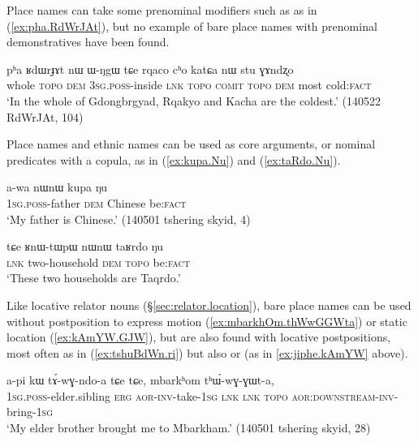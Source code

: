 Place names can take some prenominal modifiers such as  as in (\ref{ex:pha.RdWrJAt}), but no example of bare place names with prenominal demonstratives have been found. 

\begin{exe}
\ex \label{ex:pha.RdWrJAt}
 \gll pʰa ʁdɯrɟɤt nɯ ɯ-ŋgɯ tɕe rqaco cʰo katɕa nɯ stu ɣɤndʐo \\
 whole  \textsc{topo} \textsc{dem} \textsc{3sg}.\textsc{poss}-inside \textsc{lnk}  \textsc{topo} \textsc{comit}  \textsc{topo} \textsc{dem} most cold:\textsc{fact} \\
 \glt  `In the whole of Gdongbrgyad, Rqakyo and Kacha are the coldest.' (140522 RdWrJAt, 104)
\end{exe}

Place names and ethnic names can be used as core arguments, or nominal predicates with a copula, as in (\ref{ex:kupa.Nu}) and (\ref{ex:taRdo.Nu}).

\begin{exe}
\ex \label{ex:kupa.Nu}
\gll  a-wa nɯnɯ kupa ŋu \\
\textsc{1sg}.\textsc{poss}-father \textsc{dem} Chinese be:\textsc{fact}  \\
\glt `My father is Chinese.' (140501 tshering skyid, 4)
\end{exe}

\begin{exe}
\ex \label{ex:taRdo.Nu}
\gll  tɕe ʁnɯ-tɯpɯ nɯnɯ taʁrdo ŋu  \\
\textsc{lnk} two-household \textsc{dem}  \textsc{topo} be:\textsc{fact} \\
\glt `These two households are Taqrdo.' 
\end{exe}

Like locative relator nouns (§\ref{sec:relator.location}), bare place names can be used without postposition to express motion (\ref{ex:mbarkhOm.thWwGGWta}) or static location (\ref{ex:kAmYW.GJW}), but are also found with locative postpositions, most often  as in (\ref{ex:tshuBdWn.ri}) but also  or  (as in \ref{ex:jiphe.kAmYW} above).

\begin{exe}
\ex \label{ex:mbarkhOm.thWwGGWta}
 \gll a-pi kɯ tɤ́-wɣ-ndo-a tɕe tɕe, mbarkʰom tʰɯ́-wɣ-ɣɯt-a, \\
 \textsc{1sg}.\textsc{poss}-elder.sibling  \textsc{erg} \textsc{aor}-\textsc{inv}-take-\textsc{1sg} \textsc{lnk} \textsc{lnk}  \textsc{topo}   \textsc{aor}:\textsc{downstream}-\textsc{inv}-bring-\textsc{1sg}  \\
\glt `My elder brother brought me to Mbarkham.' (140501 tshering skyid, 28)
\end{exe}

